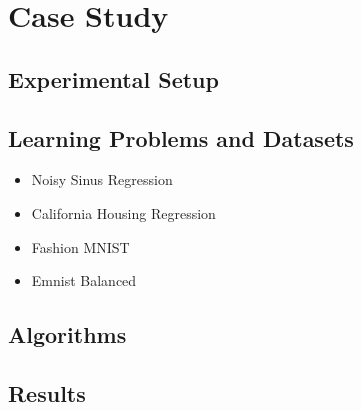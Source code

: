 \section{Case Study}
\subsection{Experimental Setup}
\subsection{Learning Problems and Datasets}
\begin{itemize}
    \item Noisy Sinus Regression
    \item California Housing Regression
    \item Fashion MNIST
    \item Emnist Balanced
\end{itemize}
\subsection{Algorithms}
\subsection{Results}
